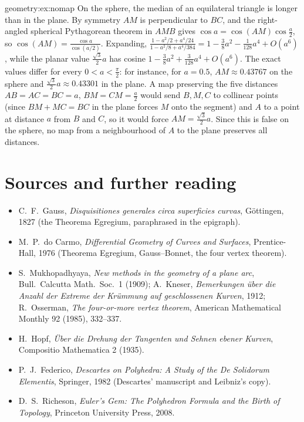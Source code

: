 \begin{solution}{geometry:ex:nomap}
\idea On the sphere, the median of an equilateral triangle is longer than in the plane.
\writeup By symmetry $AM$ is perpendicular to $BC$, and the right-angled spherical Pythagorean theorem in $AMB$ gives $\cos a=\cos(AM)\cos\frac a2$, so
$\cos(AM)=\frac{\cos a}{\cos(a/2)}$. Expanding, $\frac{1-a^2/2+a^4/24}{1-a^2/8+a^4/384}=1-\frac38a^2-\frac1{128}a^4+O(a^6)$, while the planar value $\frac{\sqrt3}2a$ has cosine
$1-\frac38a^2+\frac{3}{128}a^4+O(a^6)$. The exact values differ for every $0<a<\frac\pi2$: for instance, for $a=0.5$, $AM\approx0.43767$ on the sphere and
$\frac{\sqrt3}2a\approx0.43301$ in the plane. A map preserving the five distances $AB=AC=BC=a$, $BM=CM=\frac a2$ would send $B,M,C$ to collinear points (since
$BM+MC=BC$ in the plane forces $M$ onto the segment) and $A$ to a point at distance $a$ from $B$ and $C$, so it would force $AM=\frac{\sqrt3}2a$. Since this is false on the
sphere, no map from a neighbourhood of $A$ to the plane preserves all distances.
\end{solution}

\section*{Sources and further reading}

\begin{itemize}
\item C.~F.~Gauss, \emph{Disquisitiones generales circa superficies curvas}, G\"ottingen, 1827 (the Theorema Egregium, paraphrased in the epigraph).
\item M.~P.~do Carmo, \emph{Differential Geometry of Curves and Surfaces}, Prentice-Hall, 1976 (Theorema Egregium, Gauss--Bonnet, the four vertex theorem).
\item S.~Mukhopadhyaya, \emph{New methods in the geometry of a plane arc}, Bull.\ Calcutta Math.\ Soc.\ 1 (1909); A.~Kneser, \emph{Bemerkungen \"uber die Anzahl der
Extreme der Kr\"ummung auf geschlossenen Kurven}, 1912; R.~Osserman, \emph{The four-or-more vertex theorem}, American Mathematical Monthly 92 (1985), 332--337.
\item H.~Hopf, \emph{\"Uber die Drehung der Tangenten und Sehnen ebener Kurven}, Compositio Mathematica 2 (1935).
\item P.~J.~Federico, \emph{Descartes on Polyhedra: A Study of the De Solidorum Elementis}, Springer, 1982 (Descartes' manuscript and Leibniz's copy).
\item D.~S.~Richeson, \emph{Euler's Gem: The Polyhedron Formula and the Birth of Topology}, Princeton University Press, 2008.
\end{itemize}
